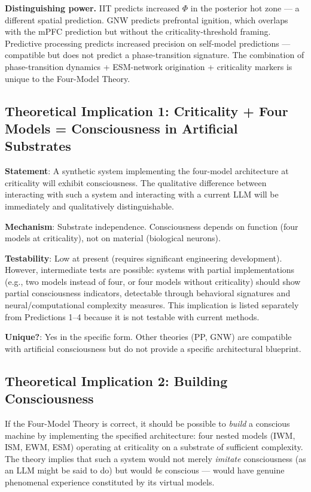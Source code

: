 \documentclass[12pt]{article}
\begin{document}
\textbf{Distinguishing power.} IIT predicts increased $\Phi$ in the posterior hot zone --- a different spatial prediction. GNW predicts prefrontal ignition, which overlaps with the mPFC prediction but without the criticality-threshold framing. Predictive processing predicts increased precision on self-model predictions --- compatible but does not predict a phase-transition signature. The combination of phase-transition dynamics + ESM-network origination + criticality markers is unique to the Four-Model Theory.


\subsection{Theoretical Implication 1: Criticality + Four Models = Consciousness in Artificial Substrates}


\textbf{Statement}: A synthetic system implementing the four-model architecture at criticality will exhibit consciousness. The qualitative difference between interacting with such a system and interacting with a current LLM will be immediately and qualitatively distinguishable.

\textbf{Mechanism}: Substrate independence. Consciousness depends on function (four models at criticality), not on material (biological neurons).

\textbf{Testability}: Low at present (requires significant engineering development). However, intermediate tests are possible: systems with partial implementations (e.g., two models instead of four, or four models without criticality) should show partial consciousness indicators, detectable through behavioral signatures and neural/computational complexity measures. This implication is listed separately from Predictions 1--4 because it is not testable with current methods.

\textbf{Unique?}: Yes in the specific form. Other theories (PP, GNW) are compatible with artificial consciousness but do not provide a specific architectural blueprint.


\subsection{Theoretical Implication 2: Building Consciousness}


If the Four-Model Theory is correct, it should be possible to \emph{build} a conscious machine by implementing the specified architecture: four nested models (IWM, ISM, EWM, ESM) operating at criticality on a substrate of sufficient complexity. The theory implies that such a system would not merely \emph{imitate} consciousness (as an LLM might be said to do) but would \emph{be} conscious --- would have genuine phenomenal experience constituted by its virtual models.
\end{document}
